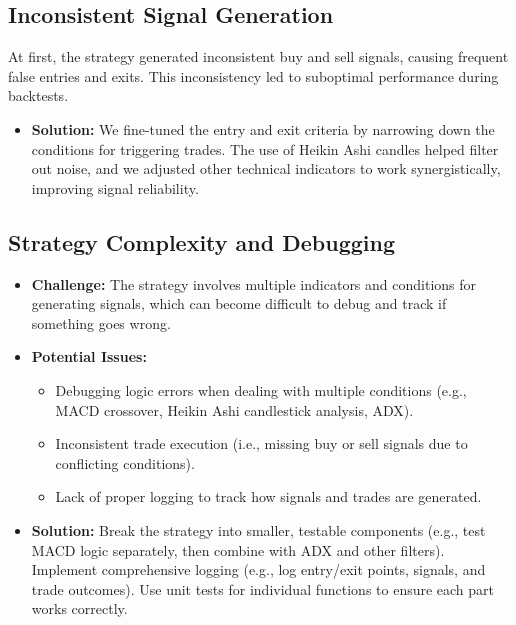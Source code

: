 \documentclass[12pt]{article}
\begin{document}
\subsection{Inconsistent Signal Generation}
At first, the strategy generated inconsistent buy and sell signals, causing frequent false entries and exits. This inconsistency led to suboptimal performance during backtests.
\begin{itemize}
    \item \textbf{Solution:} We fine-tuned the entry and exit criteria by narrowing down the conditions for triggering trades. The use of Heikin Ashi candles helped filter out noise, and we adjusted other technical indicators to work synergistically, improving signal reliability.
\end{itemize}

\subsection{Strategy Complexity and Debugging}
\begin{itemize}
    \item \textbf{Challenge:} The strategy involves multiple indicators and conditions for generating signals, which can become difficult to debug and track if something goes wrong.
    \item \textbf{Potential Issues:}
    \begin{itemize}
        \item Debugging logic errors when dealing with multiple conditions (e.g., MACD crossover, Heikin Ashi candlestick analysis, ADX).
        \item Inconsistent trade execution (i.e., missing buy or sell signals due to conflicting conditions).
        \item Lack of proper logging to track how signals and trades are generated.
    \end{itemize}
    \item \textbf{Solution:}
    Break the strategy into smaller, testable components (e.g., test MACD logic separately, then combine with ADX and other filters). Implement comprehensive logging (e.g., log entry/exit points, signals, and trade outcomes). Use unit tests for individual functions to ensure each part works correctly.
\end{itemize}


\newpage
\newpage
\thispagestyle{empty}
\mbox{}
\end{document}
